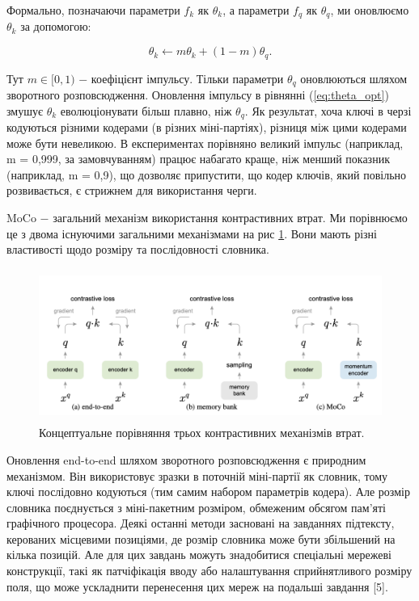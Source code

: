 Формально, позначаючи параметри $f_{k}$ як $\theta_{k}$, а параметри $f_{q}$ як $\theta_{q}$, ми оновлюємо $\theta_{k}$ за допомогою:

\begin{equation}\label{eq:theta_opt}
\theta_{k} \leftarrow m\theta_{k} + (1 - m)\theta_{q}.
\end{equation}

\vspace{1.5em}

Тут $m \in [0, 1)$ $-$ коефіцієнт імпульсу. Тільки параметри $\theta_{q}$ оновлюються шляхом зворотного розповсюдження. Оновлення імпульсу в рівнянні (\ref{eq:theta_opt}) змушує $\theta_{k}$ еволюціонувати більш плавно, ніж $\theta_{q}$. Як результат, хоча ключі в черзі кодуються різними кодерами (в різних міні-партіях), різниця між цими кодерами може бути невеликою. В експериментах порівняно великий імпульс (наприклад, m = 0,999, за замовчуванням) працює набагато краще, ніж менший показник (наприклад, m = 0,9), що дозволяє припустити, що кодер ключів, який повільно розвивається, є стрижнем для використання черги.

MoCo $-$ загальний механізм використання контрастивних втрат. Ми порівнюємо це з двома існуючими загальними механізмами на рис \ref{fig:momentum1}. Вони мають різні властивості щодо розміру та послідовності словника.

\newpage

\begin{figure}[h]
  \includegraphics[width=\textwidth, height=5cm, natwidth=474, natheight=193]{Mal/momentum1.jpg}
  \caption{Концептуальне порівняння трьох контрастивних механізмів втрат.}
  \label{fig:momentum1}
\end{figure}

Оновлення end-to-end шляхом зворотного розповсюдження є природним механізмом. Він використовує зразки в поточній міні-партії як словник, тому ключі послідовно кодуються (тим самим набором параметрів кодера). Але розмір словника поєднується з міні-пакетним розміром, обмеженим обсягом пам'яті графічного процесора. Деякі останні методи засновані на завданнях підтексту, керованих місцевими позиціями, де розмір словника може бути збільшений на кілька позицій. Але для цих завдань можуть знадобитися спеціальні мережеві конструкції, такі як патчіфікація вводу або налаштування сприйнятливого розміру поля, що може ускладнити перенесення цих мереж на подальші завдання [5].

